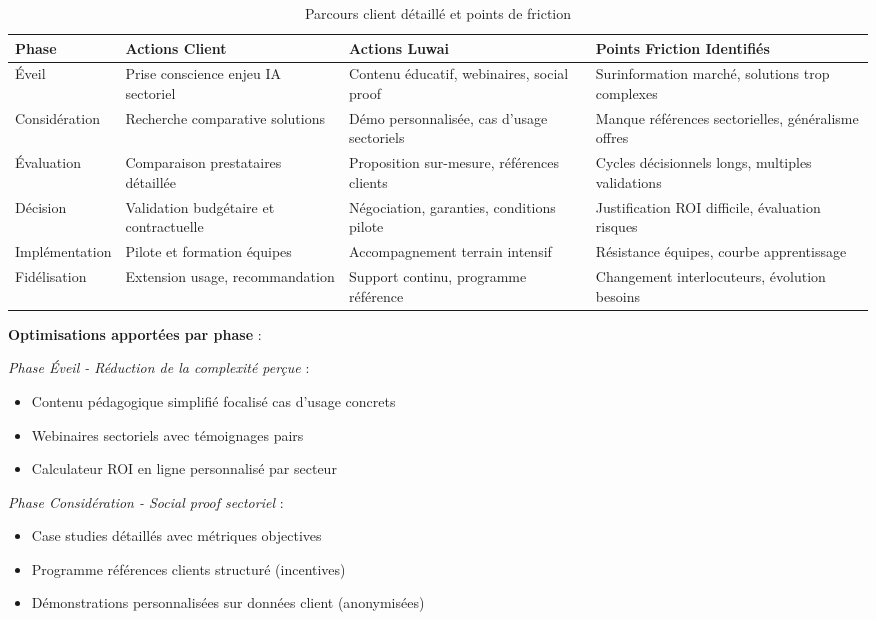 \begin{table}[ht]
\centering
\caption{Parcours client détaillé et points de friction}
\label{tab:customer_journey}
\begin{tabular}{@{}p{2.5cm}p{4cm}p{4cm}p{4.5cm}@{}}
\toprule
\textbf{Phase} & \textbf{Actions Client} & \textbf{Actions Luwai} & \textbf{Points Friction Identifiés} \\
\midrule
Éveil & Prise conscience enjeu IA sectoriel & Contenu éducatif, webinaires, social proof & Surinformation marché, solutions trop complexes \\
Considération & Recherche comparative solutions & Démo personnalisée, cas d'usage sectoriels & Manque références sectorielles, généralisme offres \\
Évaluation & Comparaison prestataires détaillée & Proposition sur-mesure, références clients & Cycles décisionnels longs, multiples validations \\
Décision & Validation budgétaire et contractuelle & Négociation, garanties, conditions pilote & Justification ROI difficile, évaluation risques \\
Implémentation & Pilote et formation équipes & Accompagnement terrain intensif & Résistance équipes, courbe apprentissage \\
Fidélisation & Extension usage, recommandation & Support continu, programme référence & Changement interlocuteurs, évolution besoins \\
\bottomrule
\end{tabular}
\end{table}

\textbf{Optimisations apportées par phase} :

\emph{Phase Éveil - Réduction de la complexité perçue} :
\begin{itemize}
    \item Contenu pédagogique simplifié focalisé cas d'usage concrets
    \item Webinaires sectoriels avec témoignages pairs
    \item Calculateur ROI en ligne personnalisé par secteur
\end{itemize}

\emph{Phase Considération - Social proof sectoriel} :
\begin{itemize}
    \item Case studies détaillés avec métriques objectives
    \item Programme références clients structuré (incentives)
    \item Démonstrations personnalisées sur données client (anonymisées)
\end{itemize}

